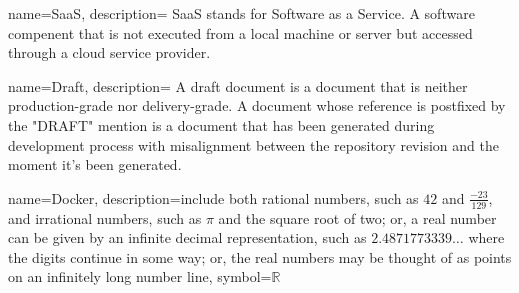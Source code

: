 {
    name={SaaS},
    description={
        SaaS stands for Software as a Service.
        A software compenent that is not executed from a local machine or server
        but accessed through a cloud service provider.
    }
}

{
    name={Draft},
    description={
        A draft document is a document that is neither production-grade nor
        delivery-grade. A document whose reference is postfixed by the "\-DRAFT"
        mention is a document that has been generated during development process
        with misalignment between the repository revision and the moment it's been
        generated.
    }
}


{
  name={Docker},
  description={include both rational numbers, such as $42$ and
               $\frac{-23}{129}$, and irrational numbers,
               such as $\pi$ and the square root of two; or,
               a real number can be given by an infinite decimal
               representation, such as $2.4871773339\ldots$ where
               the digits continue in some way; or, the real
               numbers may be thought of as points on an infinitely
               long number line},
  symbol={\ensuremath{\mathbb{R}}}
}
